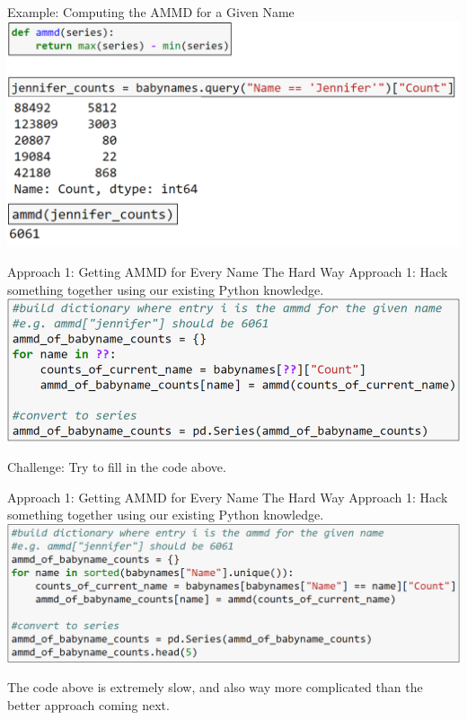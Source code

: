 \documentclass[aspectratio=169]{../latex_main/tntbeamer}  %
\begin{document}
    
    
    \begin{frame}{Example: Computing the AMMD for a Given Name}
        \includegraphics[scale=.4]{Bild19}
    \end{frame}
    
    
    \begin{frame}{Approach 1: Getting AMMD for Every Name The Hard Way}
    Approach 1: Hack something together using our existing Python knowledge.
        \includegraphics[scale=.67]{Bild20}
        
    Challenge: Try to fill in the code above.

    \end{frame}
    
    
    
    \begin{frame}{Approach 1: Getting AMMD for Every Name The Hard Way}
    Approach 1: Hack something together using our existing Python knowledge.
        \includegraphics[scale=.64]{Bild21}
        
    The code above is extremely slow, and also way more complicated than the better approach coming next.


    \end{frame}
    
\end{document}

